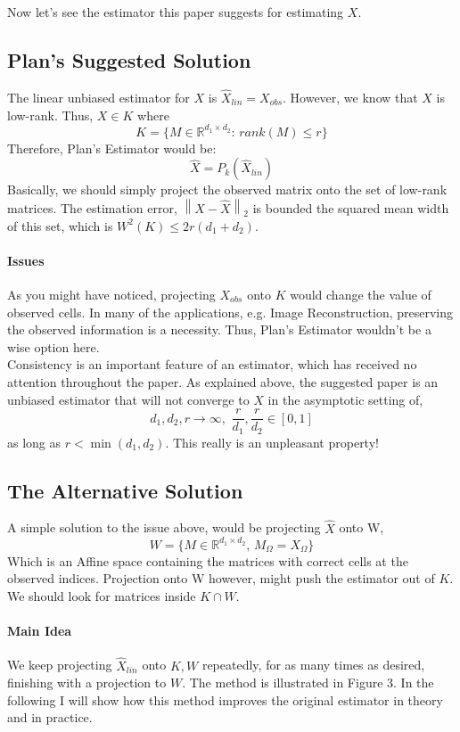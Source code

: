 \documentclass{amsart}
\theoremstyle{definition}
\theoremstyle{remark}
\numberwithin{equation}{section}
\newcommand\norm[1]{\left\lVert#1\right\rVert}
\begin{document}
Now let's see the estimator this paper suggests for estimating $X$.
\subsection{Plan's Suggested Solution} The linear unbiased estimator for $X$ is $\hat{X}_{lin}=X_{obs}$. However, we know that $X$ is low-rank. Thus, $X\in K$ where
\[
K = \{ M\in \mathbb{R}^{d_1 \times d_2}: \, rank(M)\leq r\}
\]
Therefore, Plan's Estimator would be:
\[
\hat{X} = P_k(\hat{X}_{lin})
\]
Basically, we should simply project the observed matrix onto the set of low-rank matrices. The estimation error, $\norm{X-\hat{X}}_2$ is bounded the squared mean width of this set, which is $W^2(K)\leq 2r(d_1+d_2)$.

\paragraph{Issues} As you might have noticed, projecting $X_{obs}$ onto $K$ would change the value of observed cells. In many of the applications, e.g. Image Reconstruction, preserving the observed information is a necessity. Thus, Plan's Estimator wouldn't be a wise option here.\\
Consistency is an important feature of an estimator, which has received no attention throughout the paper. As explained above, the suggested paper is an unbiased estimator that will not converge to $X$ in the asymptotic setting of,
\[d_1,d_2,r\rightarrow\infty,\,\, \frac{r}{d_1},\frac{r}{d_2}\in [0,1]\]
as long as $r < \min(d_1,d_2)$. This really is an unpleasant property!

\subsection{The Alternative Solution} A simple solution to the issue above, would be projecting $\hat{X}$ onto W,
\[
W = \{M\in \mathbb{R}^{d_1 \times d_2}, \, M_\Omega = X_\Omega \}
\]
Which is an Affine space containing the matrices with correct cells at the observed indices. Projection onto W however, might push the estimator out of $K$. We should look for matrices inside $K\cap W$. 
\paragraph{Main Idea} We keep projecting $\hat{X}_{lin}$ onto $K,W$ repeatedly, for as many times as desired, finishing with a projection to $W$. The method is illustrated in Figure 3. In the following I will show how this method improves the original estimator in theory and in practice.
\end{document}
